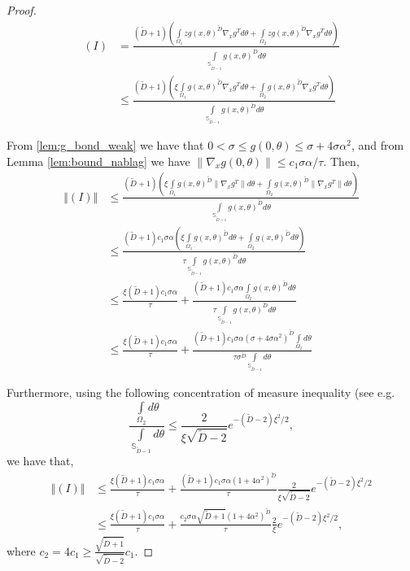 \documentclass[12pt]{article}
\theoremstyle{remark}
\newcommand{\norm}[1]{\left\Vert #1 \right\Vert}
\newcommand{\wtilde}[1]{\widetilde{#1}}
\begin{document}
\begin{appendices}
\begin{proof}
\begin{align*}
    (I) &= \frac{(\wtilde D+1)\left(\int\limits_{\Omega_1}z g(x,\theta)^{\wtilde D} \nabla_x g^T d\theta + \int\limits_{\Omega_2}z g(x,\theta)^{\wtilde D} \nabla_x g^T d\theta \right) }
{\int\limits_{\mathbb{S}_{\wtilde D-1}}g(x,\theta)^{\wtilde D} d\theta} \\
&\leq\frac{(\wtilde D+1)\left(\xi\int\limits_{\Omega_1} g(x,\theta)^{\wtilde D} \nabla_x g^T d\theta + \int\limits_{\Omega_2} g(x,\theta)^{\wtilde D} \nabla_x g^T d\theta \right)}
{\int\limits_{\mathbb{S}_{\wtilde D-1}}g(x,\theta)^{\wtilde D} d\theta}
\end{align*}

From \ref{lem:g_bond_weak} we have that $0 < \sigma \leq g(0,\theta)\leq \sigma + 4\sigma\alpha^2$, and from Lemma \ref{lem:bound_nablag} we have $\|\nabla_x g(0,\theta)\|\leq c_1 \sigma \alpha/\tau$. Then,
\begin{align*}
\norm{(I)} &\leq \frac{(\wtilde D+1)\left(\xi\int\limits_{\Omega_1} g(x,\theta)^{\wtilde D} \|\nabla_x g^T\| d\theta + \int\limits_{\Omega_2} g(x,\theta)^{\wtilde D} \|\nabla_x g^T\| d\theta \right)}
{\int\limits_{\mathbb{S}_{\wtilde D-1}}g(x,\theta)^{\wtilde D} d\theta} \\
&\leq  \frac{(\wtilde D+1)c_1 \sigma \alpha \left(\xi\int\limits_{\Omega_1} g(x,\theta)^{\wtilde D}  d\theta + \int\limits_{\Omega_2} g(x,\theta)^{\wtilde D}  d\theta \right)}
{\tau\int\limits_{\mathbb{S}_{\wtilde D-1}}g(x,\theta)^{\wtilde D} d\theta}
\\
&\leq  \frac{\xi(\wtilde D+1)c_1 \sigma \alpha}{\tau} + \frac{(\wtilde D+1)c_1 \sigma \alpha \int\limits_{\Omega_2} g(x,\theta)^{\wtilde D}  d\theta }
{\tau\int\limits_{\mathbb{S}_{\wtilde D-1}}g(x,\theta)^{\wtilde D} d\theta}
\\
&\leq  \frac{\xi(\wtilde D+1)c_1 \sigma \alpha}{\tau} + \frac{(\wtilde D+1)c_1 \sigma \alpha ( \sigma + 4\sigma\alpha^2)^{\wtilde D}\int\limits_{\Omega_2}  d\theta }
{\tau \sigma^{\wtilde D}\int\limits_{\mathbb{S}_{\wtilde D-1}} d\theta}
\end{align*}

Furthermore, using the following concentration of measure inequality (see e.g. \cite{milman2009asymptotic,Venkatesan2012high}
\begin{equation}\label{eq:Omega3_to_ball_ratio}
\frac{\int\limits_{\Omega_2}  d\theta}{\int\limits_{\mathbb{S}_{\wtilde D-1}}  d\theta} \leq \frac{2}{\xi\sqrt{\wtilde D-2}}e^{-(\wtilde D - 2 )\xi^2/2}
,\end{equation}
we have that,
\begin{align*}
    \norm{(I)} 
&\leq  \frac{\xi(\wtilde D+1)c_1 \sigma\alpha}{\tau} + \frac{(\wtilde D+1)c_1 \sigma\alpha (1 + 4\alpha^2)^{\wtilde D} }
{\tau}\frac{2}{\xi\sqrt{\wtilde D-2}}e^{-(\wtilde D - 2 )\xi^2/2}
\\
&\leq  \frac{\xi(\wtilde D+1)c_1 \sigma\alpha}{\tau} + \frac{c_2 \sigma\alpha \sqrt{\wtilde D+1}( 1 + 4\alpha^2)^{\wtilde D} }
{\tau}\frac{2}{\xi}e^{-(\wtilde D - 2 )\xi^2/2}
,\end{align*}
where $c_2 = 4c_1 \geq \frac{\sqrt{\wtilde D +1}}{\sqrt{\wtilde D - 2}} c_1$.


\end{proof}
\end{appendices}
\end{document}
